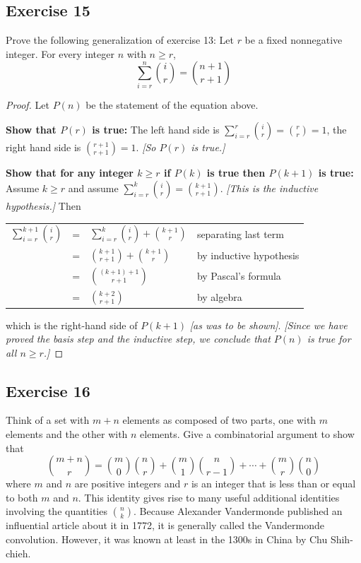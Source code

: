 \documentclass[14pt]{extarticle}
\newcommand{\dps}{\displaystyle}
\newcommand{\cy}{\color{cyan}}
\begin{document}
\subsection{Exercise 15}
Prove the following generalization of exercise 13: Let \(r\) be a fixed nonnegative integer. For every integer \(n\) with 
\(n \geq r\),
\[
\sum_{i=r}^{n}\binom{i}{r} = \binom{n+1}{r+1}
\]
\begin{proof}
Let \(P(n)\) be the statement of the equation above.

{\bf Show that \(P(r)\) is true:} The left hand side is 
\(\sum_{i=r}^r \binom{i}{r} = \binom{r}{r} = 1\), the right 
hand side is \(\binom{r+1}{r+1} = 1\). {\it [So \(P(r)\) is true.]} 

{\bf Show that for any integer \(k \geq r\) if \(P(k)\) is true then \(P(k+1)\) is true:} Assume \(k \geq r\) and assume 
\(\sum_{i=r}^{k}\binom{i}{r} = \binom{k+1}{r+1}\). {\it [This is the inductive hypothesis.]} Then
\begin{center}
\begin{tabular}{rcll}
\(\dps \sum_{i=r}^{k+1} \binom{i}{r}\) & = & \(\dps \sum_{i=r}^{k} \binom{i}{r} + \binom{k+1}{r}\) & {\cy separating last 
term} \\
& = & \(\dps \binom{k+1}{r+1} + \binom{k+1}{r}\) & {\cy by inductive hypothesis} \\
& = & \(\dps \binom{(k+1)+1}{r+1}\) & {\cy by Pascal's formula} \\
& = & \(\dps \binom{k+2}{r+1}\) & {\cy by algebra}
\end{tabular}
\end{center}
which is the right-hand side of \(P(k + 1)\) {\it [as was to be shown]}. {\it [Since we have proved the basis step and the 
inductive step, we conclude that \(P(n)\) is true for all \(n \geq r\).]}
\end{proof}

\subsection{Exercise 16}
Think of a set with \(m + n\) elements as composed of two parts, one with \(m\) elements and the other with \(n\) 
elements. Give a combinatorial argument to show that
\[
\binom{m+n}{r} = \binom{m}{0}\binom{n}{r} + \binom{m}{1}\binom{n}{r-1} + \cdots + \binom{m}{r}\binom{n}{0}
\]
where \(m\) and \(n\) are positive integers and \(r\) is an integer that is less than or equal to both \(m\) and \(n\). 
This identity gives rise to many useful additional identities involving the quantities \(\binom{n}{k}\). Because Alexander 
Vandermonde published an influential article about it in 1772, it is generally called the Vandermonde convolution. However, it was known at least in the 1300s in China by Chu Shih-chieh.
\end{document}
